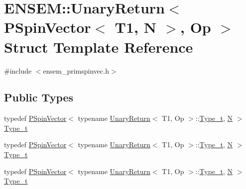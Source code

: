\hypertarget{structENSEM_1_1UnaryReturn_3_01PSpinVector_3_01T1_00_01N_01_4_00_01Op_01_4}{}\section{E\+N\+S\+EM\+:\+:Unary\+Return$<$ P\+Spin\+Vector$<$ T1, N $>$, Op $>$ Struct Template Reference}
\label{structENSEM_1_1UnaryReturn_3_01PSpinVector_3_01T1_00_01N_01_4_00_01Op_01_4}


{\ttfamily \#include $<$ensem\+\_\+primspinvec.\+h$>$}

\subsection*{Public Types}
\begin{DoxyCompactItemize}
\item 
typedef \mbox{\hyperlink{classENSEM_1_1PSpinVector}{P\+Spin\+Vector}}$<$ typename \mbox{\hyperlink{structENSEM_1_1UnaryReturn}{Unary\+Return}}$<$ T1, Op $>$\+::\mbox{\hyperlink{structENSEM_1_1UnaryReturn_3_01PSpinVector_3_01T1_00_01N_01_4_00_01Op_01_4_aa89ab5c0224d9343b5849e81a52271d4}{Type\+\_\+t}}, \mbox{\hyperlink{adat__devel_2lib_2hadron_2operator__name__util_8cc_a7722c8ecbb62d99aee7ce68b1752f337}{N}} $>$ \mbox{\hyperlink{structENSEM_1_1UnaryReturn_3_01PSpinVector_3_01T1_00_01N_01_4_00_01Op_01_4_aa89ab5c0224d9343b5849e81a52271d4}{Type\+\_\+t}}
\item 
typedef \mbox{\hyperlink{classENSEM_1_1PSpinVector}{P\+Spin\+Vector}}$<$ typename \mbox{\hyperlink{structENSEM_1_1UnaryReturn}{Unary\+Return}}$<$ T1, Op $>$\+::\mbox{\hyperlink{structENSEM_1_1UnaryReturn_3_01PSpinVector_3_01T1_00_01N_01_4_00_01Op_01_4_aa89ab5c0224d9343b5849e81a52271d4}{Type\+\_\+t}}, \mbox{\hyperlink{adat__devel_2lib_2hadron_2operator__name__util_8cc_a7722c8ecbb62d99aee7ce68b1752f337}{N}} $>$ \mbox{\hyperlink{structENSEM_1_1UnaryReturn_3_01PSpinVector_3_01T1_00_01N_01_4_00_01Op_01_4_aa89ab5c0224d9343b5849e81a52271d4}{Type\+\_\+t}}
\item 
typedef \mbox{\hyperlink{classENSEM_1_1PSpinVector}{P\+Spin\+Vector}}$<$ typename \mbox{\hyperlink{structENSEM_1_1UnaryReturn}{Unary\+Return}}$<$ T1, Op $>$\+::\mbox{\hyperlink{structENSEM_1_1UnaryReturn_3_01PSpinVector_3_01T1_00_01N_01_4_00_01Op_01_4_aa89ab5c0224d9343b5849e81a52271d4}{Type\+\_\+t}}, \mbox{\hyperlink{adat__devel_2lib_2hadron_2operator__name__util_8cc_a7722c8ecbb62d99aee7ce68b1752f337}{N}} $>$ \mbox{\hyperlink{structENSEM_1_1UnaryReturn_3_01PSpinVector_3_01T1_00_01N_01_4_00_01Op_01_4_aa89ab5c0224d9343b5849e81a52271d4}{Type\+\_\+t}}
\end{DoxyCompactItemize}


